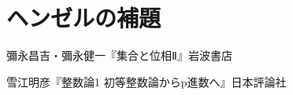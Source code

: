 \documentclass[uplatex]{jsarticle}
\theoremstyle{definition} %
\begin{document}
\section{ヘンゼルの補題}

\begin{thebibliography}{9}
\item 彌永昌吉・彌永健一『集合と位相Ⅱ』岩波書店
\item 雪江明彦『整数論1 初等整数論からp進数へ』日本評論社
\end{thebibliography}
\end{document}
